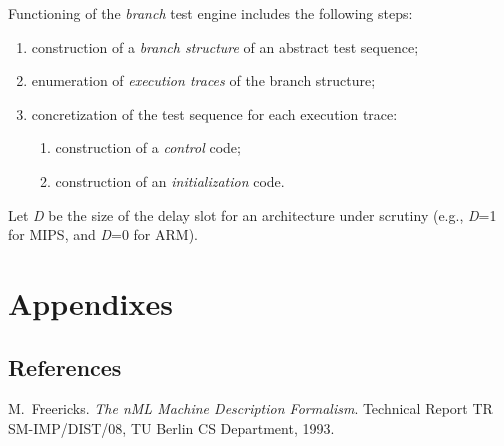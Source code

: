 \documentclass[oneside,final,12pt]{extreport}
\begin{document}
Functioning of the \emph{branch} test engine includes the following steps:

\begin{enumerate}
  \item construction of a \emph{branch structure} of an abstract test sequence;
  \item enumeration of \emph{execution traces} of the branch structure;
  \item concretization of the test sequence for each execution trace:
  \begin{enumerate}
    \item construction of a \emph{control} code;
    \item construction of an \emph{initialization} code.
  \end{enumerate}
\end{enumerate}

Let \emph{D} be the size of the delay slot for an architecture under scrutiny (e.g., \emph{D}=1
for MIPS, and \emph{D}=0 for ARM).


\chapter{Appendixes}

\section{References}



\begin{thebibliography}{1}

M.~Freericks.
\emph{The nML Machine Description Formalism}.
Technical Report TR SM-IMP/DIST/08, TU Berlin CS Department, 1993.

\end{thebibliography}
\end{document}
